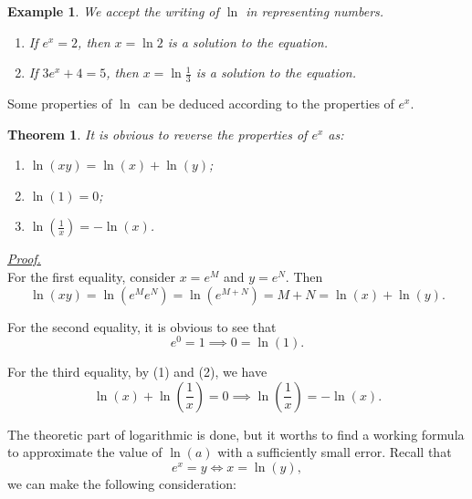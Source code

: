 \documentclass[12pt]{article}
\newtheorem*{theorem}{Theorem}
\newtheorem*{example}{Example}
\renewenvironment{proof}[1][Proof]{\begin{snugshade*} \underline{\textit{{#1}.}}\\}{\hfill \qedsymbol \end{snugshade*}}
\begin{document}
    \begin{example}
        We accept the writing of $\ln$ in representing numbers.\begin{enumerate}
            \item If $e^x=2$, then $x=\ln{2}$ is a solution to the equation.
            \item If $3e^x+4=5$, then $x=\ln{\frac{1}{3}}$ is a solution to the equation.
        \end{enumerate}
    \end{example}

    Some properties of $\ln$ can be deduced according to the properties of $e^x$.

    \begin{theorem}
        It is obvious to reverse the properties of $e^x$ as:\begin{enumerate}
            \item $\ln(xy)=\ln(x)+\ln(y)$;
            \item $\ln(1)=0$;
            \item $\ln(\frac{1}{x})=-\ln(x)$.
        \end{enumerate}
    \end{theorem}

    \begin{proof}
        For the first equality, consider $x=e^M$ and $y=e^N$. Then \[\ln(xy)=\ln(e^M e^N)=\ln(e^{M+N})=M+N=\ln(x)+\ln(y).\]

        For the second equality, it is obvious to see that \[e^0=1 \implies 0=\ln(1).\]

        For the third equality, by (1) and (2), we have \[\ln(x)+\ln(\frac{1}{x})=0 \implies \ln(\frac{1}{x})=-\ln(x).\]
    \end{proof}

    The theoretic part of logarithmic is done, but it worths to find a working formula to approximate the value of $\ln(a)$ with a sufficiently small error. Recall that \[e^x=y \iff x=\ln(y),\] we can make the following consideration:
\end{document}
